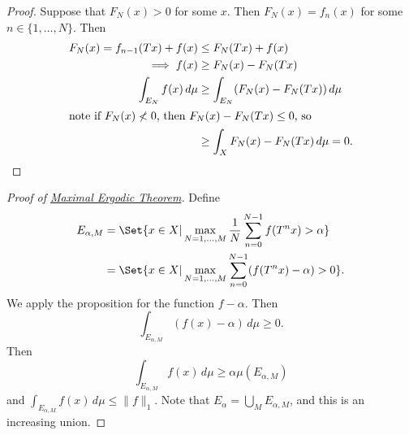 \documentclass{article}
\begin{document}
\begin{proof}
  Suppose that $F_N(x) > 0$ for some $x$.
  Then $F_N(x) = f_n(x)$ for some $n \in \{1, \dotsc, N\}$. Then
  \begin{align*}
    F_N(x) = f_{n-1}(Tx) + f(x) &\leq F_N(Tx) + f(x) \\
    \implies f(x) &\geq F_N(x) - F_N(Tx) \\
    \int_{E_N} f(x)\,d\mu &\geq \int_{E_N} (F_N(x) - F_N(Tx))\,d\mu \\
    \shortintertext{note if $F_N(x) \nless 0$, then $F_N(x) - F_N(Tx) \leq 0$, so}
                                                 & \geq \int_X F_N(x) - F_N(Tx)\,d\mu = 0. \qedhere
  \end{align*}
\end{proof}
\begin{proof}[Proof of \hyperlink{thm:maxet}{Maximal Ergodic Theorem}]
  Define
  \begin{align*}
    E_{\alpha,M} &= \Set{x \in X | \max_{N = 1, \dotsc, M} \frac{1}{N} \sum_{n=0}^{N-1} f(T^n x) > \alpha} \\
                 &= \Set{x \in X | \max_{N = 1, \dotsc, M} \sum_{n=0}^{N-1} (f(T^n x) - \alpha) > 0}.
  \end{align*}
  We apply the proposition for the function $f - \alpha$.
  Then
  \begin{equation*}
    \int_{E_{\alpha,M}} (f(x) - \alpha)\,d\mu \geq 0.
  \end{equation*}
  Then
  \begin{equation*}
    \int_{E_{\alpha,M}} f(x)\,d\mu \geq \alpha \mu(E_{\alpha,M})
  \end{equation*}
  and $\int_{E_{\alpha,M}} f(x) \, d\mu \leq \|f\|_1$.
  Note that $E_\alpha = \bigcup_M E_{\alpha,M}$, and this is an increasing union.
\end{proof}
\end{document}
